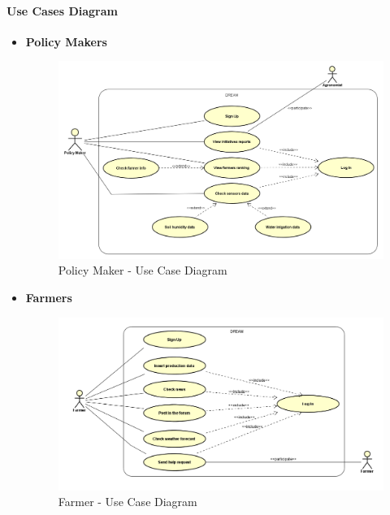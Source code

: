 \documentclass[table, 12pt]{article}
\begin{document}
\paragraph{Use Cases Diagram}
\begin{itemize}
    \item \textbf {Policy Makers}
    \begin{center}
        \begin{figure}[H]
            \includegraphics[scale=0.55, center]{assets/Use cases/UseCase_PolicyMaker.png}
            \caption{Policy Maker - Use Case Diagram}
            \label{fig: UseCase_PolicyMaker}
        \end{figure}
    \end{center}
    \newpage
    \item \textbf {Farmers}
    \begin{center}
        \begin{figure}[H]
            \includegraphics[scale=0.60, center]{assets/Use cases/UseCase_Farmer.png}
            \caption{Farmer - Use Case Diagram}
            \label{fig: UseCase_Farmer}
        \end{figure}

\end{center}
\end{itemize}
\end{document}
